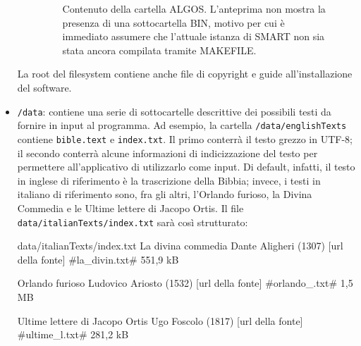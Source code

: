 \begin{itemize}
\begin{itemize}
        \begin{figure}[ht!]
        \centering
        \caption{Contenuto della cartella ALGOS. L'anteprima non mostra la presenza di una sottocartella BIN, motivo per cui è immediato assumere che l'attuale istanza di SMART non sia stata ancora compilata tramite MAKEFILE.}
        \label{fig:esempio}
        \end{figure}
    \end{itemize}
    La root del filesystem contiene anche file di copyright e guide all'installazione del software.
    \item \verb|/data|: contiene una serie di sottocartelle descrittive dei possibili testi da fornire in input al programma. Ad esempio, la cartella \verb|/data/englishTexts| contiene \verb|bible.text| e \verb|index.txt|. Il primo conterrà il testo grezzo in UTF-8; il secondo conterrà alcune informazioni di indicizzazione del testo per permettere all'applicativo di utilizzarlo come input. Di default, infatti, il testo in inglese di riferimento è la trascrizione della Bibbia; invece, i testi in italiano di riferimento sono, fra gli altri, l'Orlando furioso, la Divina Commedia e le Ultime lettere di Jacopo Ortis. Il file \verb|data/italianTexts/index.txt| sarà così strutturato:
    
    \begin{sexylisting}{data/italianTexts/index.txt}
La divina commedia
Dante Aligheri (1307)
[url della fonte]
#la_divin.txt#
551,9 kB

Orlando furioso
Ludovico Ariosto (1532)
[url della fonte]
#orlando_.txt#
1,5 MB

Ultime lettere di Jacopo Ortis
Ugo Foscolo (1817)
[url della fonte]
#ultime_l.txt#
281,2 kB


\end{sexylisting}
\end{itemize}

